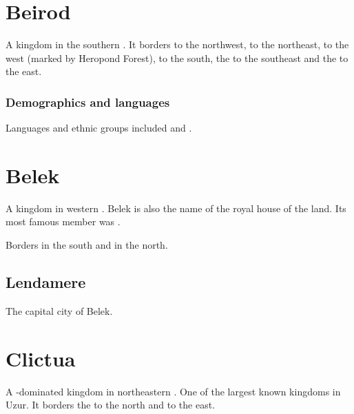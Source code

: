 \section{Beirod}
A kingdom in the southern . 
It borders  to the northwest,  to the northeast,  to the west (marked by Heropond Forest),  to the south, the \Risvaelsea{} to the southeast and the  to the east.  





\subsubsection{Demographics and languages}
Languages and ethnic groups included  and . 















\section{Belek}
A kingdom in western \Velcad{}. 
Belek is also the name of the royal house of the land. 
Its most famous member was . 

Borders  in the south and  in the north. 









\subsection{Lendamere}
The capital city of Belek. 















\section{Clictua}
A -dominated kingdom in northeastern . 
One of the largest known kingdoms in Uzur. 
It borders the  to the north and  to the east. 





